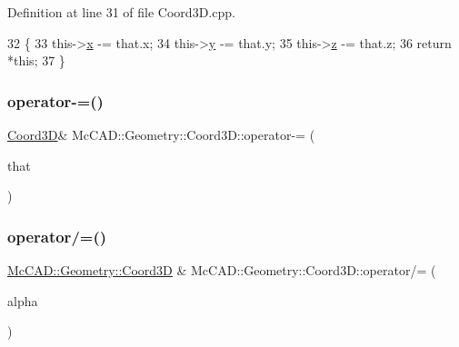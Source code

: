 Definition at line 31 of file Coord3\+D.\+cpp.


\begin{DoxyCode}
32                             \{
33     this->\hyperlink{classMcCAD_1_1Geometry_1_1Coord3D_a82467d541e4e330484b7f4d589b433b4}{x} -= that.x;
34     this->\hyperlink{classMcCAD_1_1Geometry_1_1Coord3D_af6512434da6e0242b2606e2341abc01d}{y} -= that.y;
35     this->\hyperlink{classMcCAD_1_1Geometry_1_1Coord3D_a5f89140bda6825a0a21d0064d05d9f4b}{z} -= that.z;
36     \textcolor{keywordflow}{return} *\textcolor{keyword}{this};
37 \}
\end{DoxyCode}
\mbox{\label{classMcCAD_1_1Geometry_1_1Coord3D_aed048b084632193753138b4dfdb10268}} 
\subsubsection{\texorpdfstring{operator-\/=()}{operator-=()}\hspace{0.1cm}{\footnotesize\ttfamily [2/2]}}
{\footnotesize\ttfamily \hyperlink{classMcCAD_1_1Geometry_1_1Coord3D}{Coord3D}\& Mc\+C\+A\+D\+::\+Geometry\+::\+Coord3\+D\+::operator-\/= (\begin{DoxyParamCaption}\item[{const \hyperlink{classMcCAD_1_1Geometry_1_1Coord3D}{Coord3D} \&}]{that }\end{DoxyParamCaption})}

\mbox{\label{classMcCAD_1_1Geometry_1_1Coord3D_af5d62e224cf9c299ae4f70ee158da257}} 
\subsubsection{\texorpdfstring{operator/=()}{operator/=()}\hspace{0.1cm}{\footnotesize\ttfamily [1/2]}}
{\footnotesize\ttfamily \hyperlink{classMcCAD_1_1Geometry_1_1Coord3D}{Mc\+C\+A\+D\+::\+Geometry\+::\+Coord3D} \& Mc\+C\+A\+D\+::\+Geometry\+::\+Coord3\+D\+::operator/= (\begin{DoxyParamCaption}\item[{const \hyperlink{namespaceMcCAD_1_1Geometry_ac043b37a4a7e849fca22869e1982d2f8}{coord\+\_\+type} \&}]{alpha }\end{DoxyParamCaption})}



